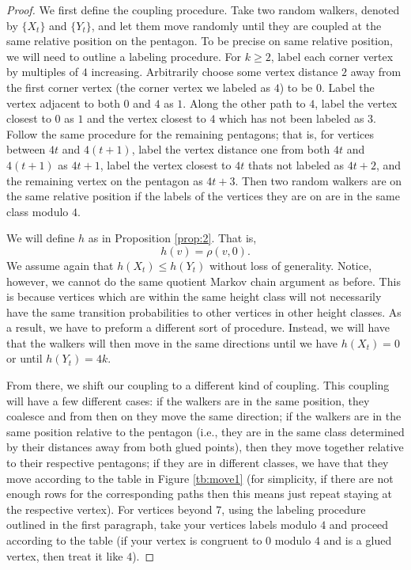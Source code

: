 \documentclass[10pt,a4paper]{amsart}
\theoremstyle{definition}
\numberwithin{definition}{section}
\begin{document}
\begin{proof}

We first define the coupling procedure. Take two random walkers, denoted by $\{X_t\}$ and $\{Y_t\}$, and let them move randomly until they are coupled at the same relative position on the pentagon. To be precise on same relative position, we will need to outline a labeling procedure. For $k \geq 2$, label each corner vertex by multiples of $4$ increasing. Arbitrarily choose some vertex distance $2$ away from the first corner vertex (the corner vertex we labeled as $4$) to be $0$. Label the vertex adjacent to both $0$ and $4$ as $1$. Along the other path to $4$, label the vertex closest to $0$ as $1$ and the vertex closest to $4$ which has not been labeled as $3$. Follow the same procedure for the remaining pentagons; that is, for vertices between $4t$ and $4(t+1)$, label the vertex distance one from both $4t$ and $4(t+1)$ as $4t+1$, label the vertex closest to $4t$ thats not labeled as $4t+2$, and the remaining vertex on the pentagon as $4t+3$. Then two random walkers are on the same relative position if the labels of the vertices they are on are in the same class modulo $4$. 

We will define $h$ as in Proposition \ref{prop:2}. That is, 
\[h(v) = \rho(v,0).\]
We assume again that $h(X_t) \leq h(Y_t)$ without loss of generality. Notice, however, we cannot do the same quotient Markov chain argument as before. This is because vertices which are within the same height class will not necessarily have the same transition probabilities to other vertices in other height classes. As a result, we have to preform a different sort of procedure. Instead, we will have that the walkers will then move in the same directions until we have $h(X_t) = 0$ or until $h(Y_t) = 4k$. 

From there, we shift our coupling to a different kind of coupling. This coupling will have a few different cases: if the walkers are in the same position, they coalesce and from then on they move the same direction; if the walkers are in the same position relative to the pentagon (i.e., they are in the same class determined by their distances away from both glued points), then they move together relative to their respective pentagons; if they are in different classes, we have that they move according to the table in Figure \ref{tb:move1} (for simplicity, if there are not enough rows for the corresponding paths then this means just repeat staying at the respective vertex). For vertices beyond $7$, using the labeling procedure outlined in the first paragraph, take your vertices labels modulo $4$ and proceed according to the table (if your vertex is congruent to $0$ modulo $4$ and is a glued vertex, then treat it like $4$).


\end{proof}
\end{document}
